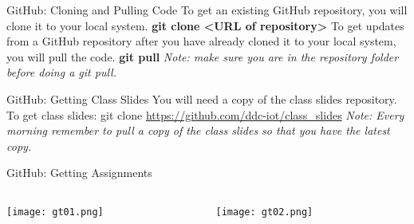 \documentclass{beamer}
\begin{document}
\begin{frame}{GitHub: Cloning and Pulling Code}
To get an existing GitHub repository, you will clone it to your local system.\newline\newline
\textbf{git clone \textless URL of repository\textgreater }\newline\newline
To get updates from a GitHub repository after you have already cloned it to your local system, you will pull the code.\newline\newline
\textbf{git pull}\newline\newline
\emph{Note: make sure you are in the repository folder before doing a git pull.}
\end{frame}

\begin{frame}{GitHub: Getting Class Slides}
You will need a copy of the class slides repository. To get class slides:\newline\newline
git clone \url{https://github.com/ddc-iot/class\_slides}\newline\newline
\emph{Note: Every morning remember to pull a copy of the class slides so that you have the latest copy.}
\end{frame}

\begin{frame}{GitHub: Getting Assignments}
\begin{columns}
\begin{column}{5cm}
\begin{overprint}
\texttt{[image: gt01.png]}
\end{overprint}
\end{column}
\begin{column}{5cm}
\begin{overprint}
\texttt{[image: gt02.png]}
\end{overprint}
\end{column}
\end{columns}

\lstNa
\end{frame}

\end{document}
